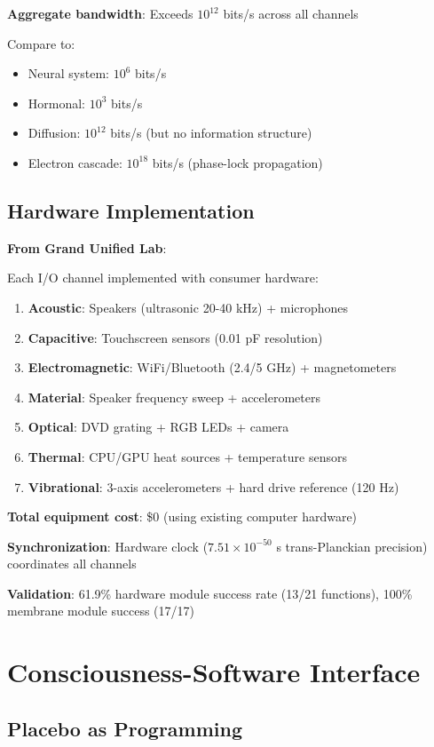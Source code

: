 \documentclass[11pt,a4paper]{article}
\begin{document}
\textbf{Aggregate bandwidth}: Exceeds $10^{12}$ bits/s across all channels

Compare to:
\begin{itemize}
\item Neural system: $10^6$ bits/s
\item Hormonal: $10^3$ bits/s
\item Diffusion: $10^{12}$ bits/s (but no information structure)
\item Electron cascade: $10^{18}$ bits/s (phase-lock propagation)
\end{itemize}

\subsection{Hardware Implementation}

\textbf{From Grand Unified Lab}:

Each I/O channel implemented with consumer hardware:
\begin{enumerate}
\item \textbf{Acoustic}: Speakers (ultrasonic 20-40 kHz) + microphones
\item \textbf{Capacitive}: Touchscreen sensors (0.01 pF resolution)
\item \textbf{Electromagnetic}: WiFi/Bluetooth (2.4/5 GHz) + magnetometers
\item \textbf{Material}: Speaker frequency sweep + accelerometers
\item \textbf{Optical}: DVD grating + RGB LEDs + camera
\item \textbf{Thermal}: CPU/GPU heat sources + temperature sensors
\item \textbf{Vibrational}: 3-axis accelerometers + hard drive reference (120 Hz)
\end{enumerate}

\textbf{Total equipment cost}: \$0 (using existing computer hardware)

\textbf{Synchronization}: Hardware clock ($7.51\times10^{-50}$ s trans-Planckian precision) coordinates all channels

\textbf{Validation}: 61.9\% hardware module success rate (13/21 functions), 100\% membrane module success (17/17)

\section{Consciousness-Software Interface}

\subsection{Placebo as Programming}
\end{document}
